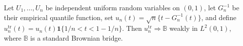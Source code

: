 Let \(U_1,\ldots,U_n\) be independent uniform random variables on \((0,1)\), let \(G_n^{-1}\) be their empirical quantile function, set \(u_n(t)=\sqrt n\{t-G_n^{-1}(t)\}\), and define \(u_n^{\mathrm{tr}}(t)=u_n(t)\mathbf 1\{1/n<t<1-1/n\}\).  Then \(u_n^{\mathrm{tr}}\Rightarrow\mathbb B\) weakly in \(L^2(0,1)\), where \(\mathbb B\) is a standard Brownian bridge.